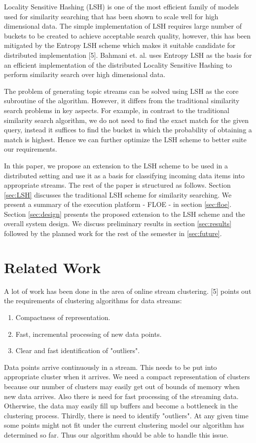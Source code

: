 \documentclass{article} %
\begin{document}
Locality Sensitive Hashing (LSH) is one of the most efficient family of models used for similarity searching that has been shown to scale well for high dimensional data. The simple implementation of LSH requires large number of buckets to be created to achieve acceptable search quality, however, this has been mitigated by the Entropy LSH scheme which makes it suitable candidate for distributed implementation [5]. Bahmani et. al. uses Entropy LSH as the basis for an efficient implementation of the distributed Locality Sensitive Hashing to perform similarity search over high dimensional data.

The problem of generating topic streams can be solved using LSH as the core subroutine of the algorithm. However, it differs from the traditional similarity search problems in key aspects. For example, in contrast to the traditional similarity search algorithm, we do not need to find the exact match for the given query, instead it suffices to find the bucket in which the probability of obtaining a match is highest. Hence we can further optimize the LSH scheme to better suite our requirements.

In this paper, we propose an extension to the LSH scheme to be used in a distributed setting and use it as a basis for classifying incoming data items into appropriate streams. The rest of the paper is structured as follows. Section \ref{sec:LSH} discusses the traditional LSH scheme for similarity searching. We present a summary of the execution platform - FLOE - in section \ref{sec:floe}. Section \ref{sec:design} presents the proposed extension to the LSH scheme and the overall system design. We discuss preliminary results in section \ref{sec:results} followed by the planned work for the rest of the semester in \ref{sec:future}.


\section{Related Work}
\label{sec:related}
A lot of work has been done in the area of online stream clustering. [5] points out the requirements of clustering algorithms for data streams:
\begin{enumerate}
\item Compactness of representation.
\item Fast, incremental processing of new data points.
\item Clear and fast identification of "outliers".
\end{enumerate}
Data points arrive continuously in a stream. This needs to be put into appropriate cluster when it arrives. We need a compact representation of clusters because our number of clusters may easily get out of bounds of memory when new data arrives. Also there is need for fast processing of the streaming data. Otherwise, the data may easily fill up buffers and become a bottleneck in the clustering process. Thirdly, there is need to identify "outliers". At any given time some points might not fit under the current clustering model our algorithm has determined so far. Thus our algorithm should be able to handle this issue.
\end{document}
